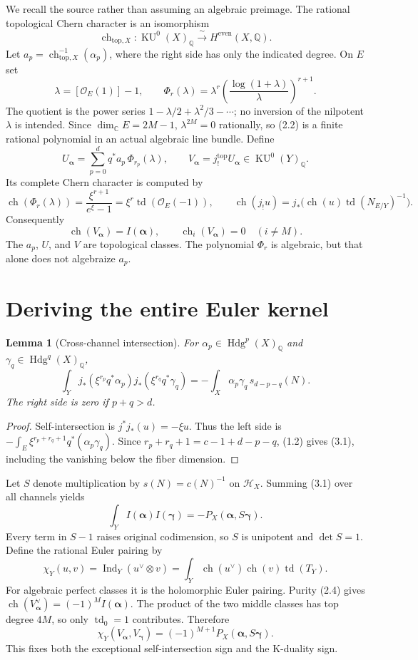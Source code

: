 \documentclass[11pt]{article}
\newcommand{\Q}{\mathbb Q}
\newcommand{\Hdg}{\operatorname{Hdg}}
\newcommand{\ch}{\operatorname{ch}}
\newcommand{\td}{\operatorname{td}}
\newcommand{\KU}{\operatorname{KU}}
\newtheorem{lemma}[theorem]{Lemma}
\begin{document}
We recall the source rather than assuming an algebraic preimage.
The rational topological Chern character is an isomorphism
\[
 \ch_{\mathrm{top},X}:\KU^0(X)_{\Q}
     \xrightarrow{\ \sim\ }H^{\mathrm{even}}(X,\Q).
\]
Let $a_p=\ch_{\mathrm{top},X}^{-1}(\alpha_p)$, where the right side
has only the indicated degree. On $E$ set
\[
 \lambda=[\mathcal O_E(1)]-1,\qquad
 \Phi_r(\lambda)
  =\lambda^r\left(\frac{\log(1+\lambda)}{\lambda}\right)^{r+1}.
 \tag{2.2}
\]
The quotient is the power series
$1-\lambda/2+\lambda^2/3-\cdots$; no inversion of the nilpotent
$\lambda$ is intended. Since $\dim_{\mathbb C}E=2M-1$,
$\lambda^{2M}=0$ rationally, so (2.2) is a finite rational
polynomial in an actual algebraic line bundle. Define
\[
 U_{\boldsymbol\alpha}
   =\sum_{p=0}^{d}q^*a_p\,\Phi_{r_p}(\lambda),\qquad
 V_{\boldsymbol\alpha}=j_!^{\mathrm{top}}U_{\boldsymbol\alpha}
      \in\KU^0(Y)_{\Q}.
 \tag{2.3}
\]
Its complete Chern character is computed by
\[
 \ch(\Phi_r(\lambda))
     =\frac{\xi^{r+1}}{e^\xi-1}
     =\xi^r\td(\mathcal O_E(-1)),\qquad
 \ch(j_!u)=j_*\bigl(\ch(u)\td(N_{E/Y})^{-1}\bigr).
\]
Consequently
\[
 \boxed{\ch(V_{\boldsymbol\alpha})
       =I(\boldsymbol\alpha),\qquad
       \ch_i(V_{\boldsymbol\alpha})=0\quad(i\ne M).}
 \tag{2.4}
\]
The $a_p$, $U$, and $V$ are topological classes. The polynomial
$\Phi_r$ is algebraic, but that alone does not algebraize $a_p$.

\section{Deriving the entire Euler kernel}
\begin{lemma}[Cross-channel intersection]
For $\alpha_p\in\Hdg^p(X)_{\Q}$ and
$\gamma_q\in\Hdg^q(X)_{\Q}$,
\[
 \int_Y j_*(\xi^{r_p}q^*\alpha_p)
         j_*(\xi^{r_q}q^*\gamma_q)
   =-\int_X\alpha_p\gamma_q\,s_{d-p-q}(N).
 \tag{3.1}
\]
The right side is zero if $p+q>d$.
\end{lemma}
\begin{proof}
Self-intersection is $j^*j_*(u)=-\xi u$. Thus the left side is
$-\int_E \xi^{r_p+r_q+1}q^*(\alpha_p\gamma_q)$.
Since $r_p+r_q+1=c-1+d-p-q$, (1.2) gives (3.1), including
the vanishing below the fiber dimension.
\end{proof}

Let $S$ denote multiplication by $s(N)=c(N)^{-1}$ on
$\mathcal H_X$. Summing (3.1) over all channels yields
\[
 \boxed{\int_Y I(\boldsymbol\alpha)I(\boldsymbol\gamma)
          =-P_X(\boldsymbol\alpha,S\boldsymbol\gamma).}
 \tag{3.2}
\]
Every term in $S-1$ raises original codimension, so $S$ is
unipotent and $\det S=1$. Define the rational Euler pairing by
\[
 \chi_Y(u,v)=\operatorname{Ind}_Y(u^\vee\otimes v)
   =\int_Y\ch(u^\vee)\ch(v)\td(T_Y).
 \tag{3.3}
\]
For algebraic perfect classes it is the holomorphic Euler pairing.
Purity (2.4) gives
$\ch(V_{\boldsymbol\alpha}^{\vee})=(-1)^M I(\boldsymbol\alpha)$.
The product of the two middle classes has top degree $4M$,
so only $\td_0=1$ contributes. Therefore
\[
 \boxed{\chi_Y(V_{\boldsymbol\alpha},V_{\boldsymbol\gamma})
      =(-1)^{M+1}P_X(\boldsymbol\alpha,S\boldsymbol\gamma).}
 \tag{3.4}
\]
This fixes both the exceptional self-intersection sign and
the K-duality sign.
\end{document}
